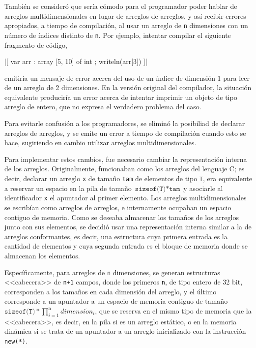 También se consideró que sería cómodo para el programador poder hablar de
arreglos multidimensionales en lugar de arreglos de arreglos, y así recibir
errores apropiados, a tiempo de compilación, al usar un arreglo de \texttt{n}
dimensiones con un número de índices distinto de \texttt{n}. Por ejemplo,
intentar compilar el siguiente fragmento de código,

\begin{gracielacode}
  |[ var arr : array [5, 10] of int
  ;  writeln(arr[3])
  ]|
\end{gracielacode}

emitiría un mensaje de error acerca del uso de un índice de dimensión 1 para
leer de un arreglo de 2 dimensiones. En la versión original del compilador, la
situación equivalente produciría un error acerca de intentar imprimir un objeto
de tipo arreglo de entero, que no expresa el verdadero problema del caso.

Para evitarle confusión a los programadores, se eliminó la posibiliad de
declarar arreglos de arreglos, y se emite un error a tiempo de compilación
cuando esto se hace, sugiriendo en cambio utilizar arreglos multidimensionales.

Para implementar estos cambios, fue necesario cambiar la representación interna
de los arreglos. Originalmente, funcionaban como los arreglos del lenguaje C; es
decir, declarar un arreglo \texttt{x} de tamaño \texttt{tam} de elementos de
tipo \texttt{T}, era equivalente a reservar un espacio en la pila de tamaño
$\texttt{sizeof(T)} * \texttt{tam}$ y asociarle al identificador \texttt{x} el
apuntador al primer elemento. Los arreglos multidimensionales se escribían como
arreglos de arreglos, e internamente ocupaban un espacio contiguo de memoria.
Como se deseaba almacenar los tamaños de los arreglos junto con sus elementos,
se decidió usar una representación interna similar a la de arreglos
conformantes, es decir, una estructura cuya primera entrada es la cantidad de
elementos y cuya segunda entrada es el bloque de memoria donde se almacenan los
elementos.

Específicamente, para arreglos de \texttt{n} dimensiones, se generan estructuras
<<cabecera>> de \texttt{n+1} campos, donde los primeros \texttt{n}, de tipo
entero de 32 bit, corresponden a los tamaños en cada dimensión del arreglo, y el
último corresponde a un apuntador a un espacio de memoria contiguo de tamaño
$\texttt{sizeof(T)} * \prod\limits_{i=1}^\texttt{n} dimensi\acute{o}n_i$, que se
reserva en el mismo tipo de memoria que la <<cabecera>>, es decir, en la pila si
es un arreglo estático, o en la memoria dinámica si se trata de un apuntador a
un arreglo inicializado con la instrucción \texttt{new(*)}.

